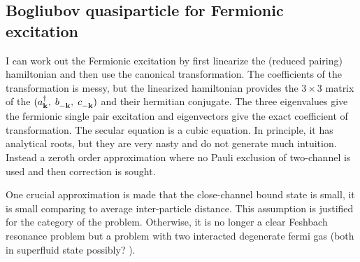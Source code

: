 \subsection{Bogliubov quasiparticle for Fermionic excitation}
I can work out the Fermionic excitation by first linearize the (reduced pairing) hamiltonian and then use the canonical transformation.  The coefficients of the transformation is messy, but the linearized hamiltonian provides the $3\times3$ matrix of the $(a^{\dagger}_{\mathbf{k}},\; b^{}_{-\mathbf{k}},\;c^{}_{-\mathbf{k}})$  and their hermitian conjugate.  The three eigenvalues give the fermionic single pair excitation and eigenvectors give the exact coefficient of transformation.  The secular equation is a cubic equation.  In principle, it has analytical roots, but they are very nasty and do not generate much intuition.  Instead a zeroth order approximation where no Pauli exclusion of two-channel is used and then correction is sought.  

One crucial approximation is made that the close-channel bound state is small, it is small comparing to average inter-particle distance.  This assumption is justified for the category of the problem.  Otherwise, it is no longer a clear Feshbach resonance problem but a problem with two interacted degenerate fermi gas (both in superfluid state possibly? ).  